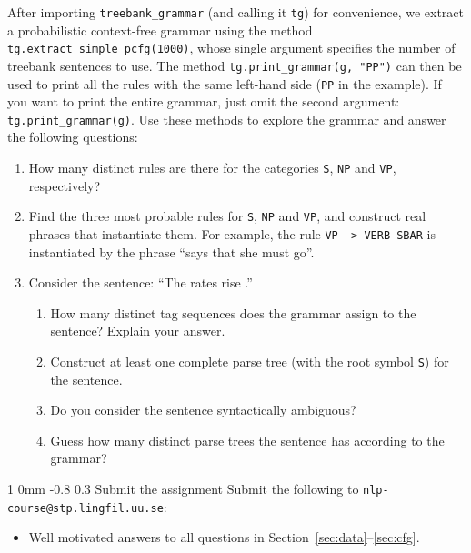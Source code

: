 \documentclass[11pt]{article}
\makeatletter
\newcommand{\newsec}[2]{\section{#1}\label{sec:#2}\noindent}
\renewcommand{\section}{\@startsection
{section}%
{1}%
{0mm}%
{-0.8\baselineskip}%
{0.3\baselineskip}%
{\bfseries\large}}%
\makeatother
\begin{document}
\begin{center}
\fbox{

}
\end{center}
After importing {\tt treebank\_grammar} (and calling it {\tt tg}) for convenience, we extract a probabilistic context-free grammar using the method {\tt tg.extract\_simple\_pcfg(1000)}, 
whose single argument specifies the number of treebank sentences to use. The method {\tt tg.print\_grammar(g, "PP")} can then be used to print all the rules with the same left-hand side
({\tt PP} in the example). If you want to print the entire grammar, just omit the second argument: {\tt tg.print\_grammar(g)}. Use these methods to explore the grammar and answer
the following questions:
\begin{enumerate}[topsep=0.2cm,itemsep=0cm]
\item How many distinct rules are there for the categories {\tt S}, {\tt NP} and {\tt VP}, respectively? 
\item Find the three most probable rules for {\tt S}, {\tt NP} and {\tt VP}, and construct real phrases that instantiate them. 
For example, the rule {\tt VP -> VERB SBAR} is instantiated by the phrase ``says that she must go''.
\item Consider the sentence: ``The rates rise .''
\begin{enumerate}[noitemsep,topsep=0cm]
\item How many distinct tag sequences does the grammar assign to the sentence? Explain your answer.
\item Construct at least one complete parse tree (with the root symbol {\tt S}) for the sentence.
\item Do you consider the sentence syntactically ambiguous?
\item Guess how many distinct parse trees the sentence has according to the grammar? 
\end{enumerate}
\end{enumerate}

\newsec{Submit the assignment}{sub}%
Submit the following to {\tt nlp-course@stp.lingfil.uu.se}: 
\begin{itemize}[noitemsep,topsep=0.2cm]
\item Well motivated answers to all questions in Section~\ref{sec:data}--\ref{sec:cfg}.
\end{itemize}
\end{document}
